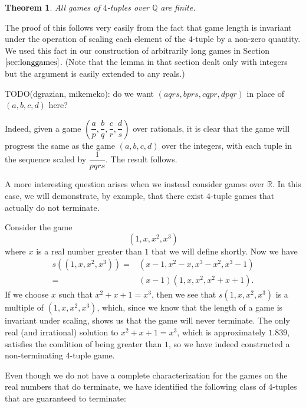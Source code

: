 \documentclass[12pt]{amsart}
\newtheorem{theorem}{Theorem}[section]
\newcommand{\diff}{s}
\begin{document}
\begin{theorem}
All games of $4$-tuples over $\mathbb{Q}$ are finite.
\end{theorem}

The proof of this follows very easily from the fact that game length is invariant under the operation of scaling each element of the $4$-tuple by a non-zero quantity. We used this fact in our construction of arbitrarily long games in Section $\ref{sec:longgames}$. (Note that the lemma in that section dealt only with integers but the argument is easily extended to any reals.)

TODO(dgrazian, mikemeko): do we want $(aqrs, bprs, cqpr, dpqr)$ in place of $(a,b,c,d)$ here?

Indeed, given a game $\left(\dfrac{a}{p}, \dfrac{b}{q}, \dfrac{c}{r}, \dfrac{d}{s}\right)$ over rationals, it is clear that the game will progress the same as the game $(a, b, c, d)$ over the integers, with each tuple in the sequence scaled by $\dfrac{1}{pqrs}$. The result follows.

A more interesting question arises when we instead consider games over $\mathbb{R}$. In this case, we will demonstrate, by example, that there exist $4$-tuple games that actually do not terminate.

Consider the game
$$
(1,x,x^2,x^3)
$$
where $x$ is a real number greater than $1$ that we will define shortly. Now we have
\begin{align*}
\diff((1,x,x^2,x^3))
= & (x-1, x^2 - x, x^3 - x^2, x^3 - 1) \\
= & (x-1) (1, x, x^2, x^2 + x + 1).
\end{align*}
If we choose $x$ such that $x^2 + x + 1 = x^3$, then we see that $s(1,x,x^2,x^3)$ is a multiple of $(1,x,x^2,x^3)$, which, since we know that the length of a game is invariant under scaling, shows us that the game will never terminate. The only real (and irrational) solution to $x^2 + x + 1 = x^3$, which is approximately $1.839$, satisfies the condition of being greater than $1$, so we have indeed constructed a non-terminating $4$-tuple game.

Even though we do not have a complete characterization for the games on the real numbers that do terminate, we have identified the following class of $4$-tuples that are guaranteed to terminate:
\end{document}
